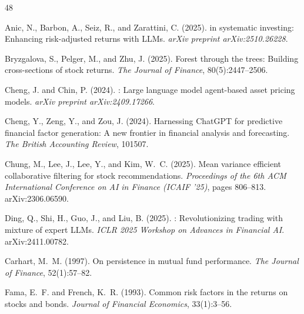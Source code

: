 \ifdefined\withappendix\else
\balance %
\fi


{
\begin{thebibliography}{48}

Anic, N., Barbon, A., Seiz, R., and Zarattini, C. (2025).
 in systematic investing: Enhancing risk-adjusted returns with {LLMs}.
\newblock \emph{arXiv preprint arXiv:2510.26228}.

Bryzgalova, S., Pelger, M., and Zhu, J. (2025).
\newblock Forest through the trees: Building cross-sections of stock returns.
\newblock \emph{The Journal of Finance}, 80(5):2447--2506.

Cheng, J. and Chin, P. (2024).
: Large language model agent-based asset pricing models.
\newblock \emph{arXiv preprint arXiv:2409.17266}.

Cheng, Y., Zeng, Y., and Zou, J. (2024).
\newblock Harnessing {ChatGPT} for predictive financial factor generation: A new frontier in financial analysis and forecasting.
\newblock \emph{The British Accounting Review}, 101507.

Chung, M., Lee, J., Lee, Y., and Kim, W.~C. (2025).
\newblock Mean variance efficient collaborative filtering for stock recommendations.
\newblock \emph{Proceedings of the 6th ACM International Conference on AI in Finance (ICAIF '25)}, pages 806--813. arXiv:2306.06590.

Ding, Q., Shi, H., Guo, J., and Liu, B. (2025).
: Revolutionizing trading with mixture of expert {LLMs}.
\newblock \emph{ICLR 2025 Workshop on Advances in Financial AI}. arXiv:2411.00782.

Carhart, M.~M. (1997).
\newblock On persistence in mutual fund performance.
\newblock \emph{The Journal of Finance}, 52(1):57--82.

Fama, E.~F. and French, K.~R. (1993).
\newblock Common risk factors in the returns on stocks and bonds.
\newblock \emph{Journal of Financial Economics}, 33(1):3--56.


\end{thebibliography}}
